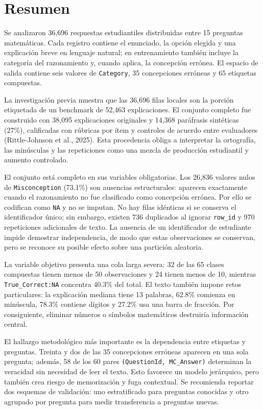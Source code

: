 \documentclass[11pt,oneside,openany]{book}
\newcommand{\codigo}[1]{\texttt{#1}}
\begin{document}
\chapter*{Resumen}

Se analizaron 36,696 respuestas estudiantiles distribuidas entre 15 preguntas
matemáticas. Cada registro contiene el enunciado, la opción elegida y una
explicación breve en lenguaje natural; en entrenamiento también incluye la
categoría del razonamiento y, cuando aplica, la concepción errónea. El espacio
de salida contiene seis valores de \codigo{Category}, 35 concepciones erróneas
y 65 etiquetas compuestas.

La investigación previa muestra que las 36,696 filas locales son la porción
etiquetada de un benchmark de 52,463 explicaciones. El conjunto completo fue
construido con 38,095 explicaciones originales y 14,368 paráfrasis sintéticas
(27\%), calificadas con rúbricas por ítem y controles de acuerdo entre
evaluadores (Rittle-Johnson et al., 2025). Esta procedencia obliga a interpretar
la ortografía, las minúsculas y las repeticiones como una mezcla de producción
estudiantil y aumento controlado.

El conjunto está completo en sus variables obligatorias. Los 26,836 valores
nulos de \codigo{Misconception} (73.1\%) son ausencias estructurales: aparecen
exactamente cuando el razonamiento no fue clasificado como concepción errónea.
Por ello se codifican como \codigo{NA} y no se imputan. No hay filas idénticas
si se conserva el identificador único; sin embargo, existen 736 duplicados al
ignorar \codigo{row\_id} y 970 repeticiones adicionales de texto. La ausencia
de un identificador de estudiante impide demostrar independencia, de modo que
estas observaciones se conservan, pero se reconoce su posible efecto sobre una
partición aleatoria.

La variable objetivo presenta una cola larga severa: 32 de las 65 clases
compuestas tienen menos de 50 observaciones y 24 tienen menos de 10, mientras
\codigo{True\_Correct:NA} concentra 40.3\% del total. El texto también impone
retos particulares: la explicación mediana tiene 13 palabras, 62.8\% comienza
en minúscula, 78.3\% contiene dígitos y 27.2\% usa una barra de fracción. Por
consiguiente, eliminar números o símbolos matemáticos destruiría información
central.

El hallazgo metodológico más importante es la dependencia entre etiquetas y
preguntas. Treinta y dos de las 35 concepciones erróneas aparecen en una sola
pregunta; además, 58 de los 60 pares \codigo{(QuestionId, MC\_Answer)}
determinan la veracidad sin necesidad de leer el texto. Esto favorece un modelo
jerárquico, pero también crea riesgo de memorización y fuga contextual. Se
recomienda reportar dos esquemas de validación: uno estratificado para preguntas
conocidas y otro agrupado por pregunta para medir transferencia a preguntas
nuevas.
\end{document}
